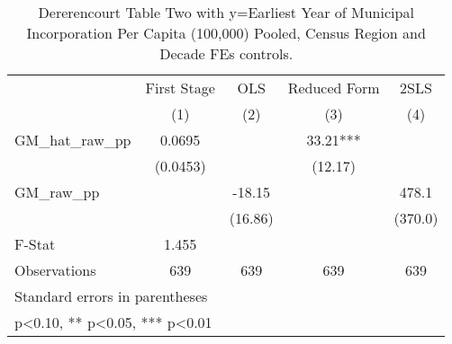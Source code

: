 \begin{table}[htbp]\centering
\def\sym#1{\ifmmode^{#1}\else\(^{#1}\)\fi}
\caption{Dererencourt Table Two with y=Earliest Year of Municipal Incorporation Per Capita (100,000) Pooled, Census Region and Decade FEs controls.}
\begin{tabular}{l*{4}{c}}
\toprule
                    & First Stage   &         OLS   &Reduced Form   &        2SLS   \\
                    &\multicolumn{1}{c}{(1)}   &\multicolumn{1}{c}{(2)}   &\multicolumn{1}{c}{(3)}   &\multicolumn{1}{c}{(4)}   \\
\midrule
GM\_hat\_raw\_pp       &      0.0695   &               &       33.21***&               \\
                    &    (0.0453)   &               &     (12.17)   &               \\
\addlinespace
GM\_raw\_pp           &               &      -18.15   &               &       478.1   \\
                    &               &     (16.86)   &               &     (370.0)   \\
\midrule
F-Stat              &       1.455   &               &               &               \\
Observations        &         639   &         639   &         639   &         639   \\
\bottomrule
\multicolumn{5}{l}{\footnotesize Standard errors in parentheses}\\
\multicolumn{5}{l}{\footnotesize * p<0.10, ** p<0.05, *** p<0.01}\\
\end{tabular}
\end{table}
